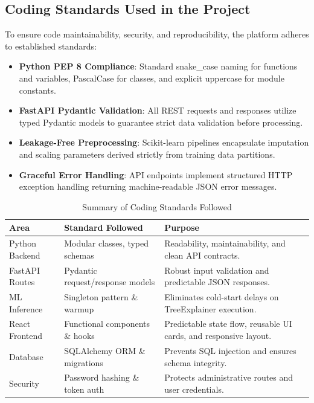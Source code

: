 \documentclass[12pt,a4paper]{article}
\begin{document}
\subsection{Coding Standards Used in the Project}\label{sub:6.1}

To ensure code maintainability, security, and reproducibility, the platform adheres to established standards:
\begin{itemize}[leftmargin=20pt]
    \item \textbf{Python PEP 8 Compliance}: Standard snake\_case naming for functions and variables, PascalCase for classes, and explicit uppercase for module constants.
    \item \textbf{FastAPI Pydantic Validation}: All REST requests and responses utilize typed Pydantic models to guarantee strict data validation before processing.
    \item \textbf{Leakage-Free Preprocessing}: Scikit-learn pipelines encapsulate imputation and scaling parameters derived strictly from training data partitions.
    \item \textbf{Graceful Error Handling}: API endpoints implement structured HTTP exception handling returning machine-readable JSON error messages.
\end{itemize}

\begin{table}[H]
\centering
\small
\caption{Summary of Coding Standards Followed}
\begin{tabularx}{\linewidth}{|L{3.2cm}|L{4.5cm}|Y|}
\hline
\textbf{Area} & \textbf{Standard Followed} & \textbf{Purpose} \\ \hline
Python Backend & Modular classes, typed schemas & Readability, maintainability, and clean API contracts. \\ \hline
FastAPI Routes & Pydantic request/response models & Robust input validation and predictable JSON responses. \\ \hline
ML Inference & Singleton pattern \& warmup & Eliminates cold-start delays on TreeExplainer execution. \\ \hline
React Frontend & Functional components \& hooks & Predictable state flow, reusable UI cards, and responsive layout. \\ \hline
Database & SQLAlchemy ORM \& migrations & Prevents SQL injection and ensures schema integrity. \\ \hline
Security & Password hashing \& token auth & Protects administrative routes and user credentials. \\ \hline
\end{tabularx}
\label{tab:coding_standards}
\end{table}
\end{document}
